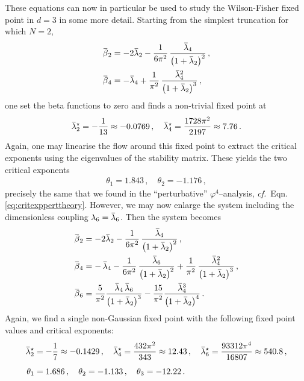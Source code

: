 \documentclass[11pt]{book}
\newcommand{\overbar}[1]{\mkern 1.5mu\overline{\mkern-1.5mu#1\mkern-1.5mu}\mkern 1.5mu}
\newcommand\cf{\textit{cf.}\ }
\numberwithin{equation}{chapter}
\begin{document}
These equations can now in particular be used to study the Wilson-Fisher fixed point
in $d=3$ in some more detail. Starting from the simplest truncation
for which $N=2$,
\begin{align}
  \overbar \beta_2 &=
  -2 \overbar \lambda_2 - \frac{1}{6\pi^2} \, \frac{ \overbar \lambda_4 }{ \big( 1 + \overbar \lambda_2 \big)^2 } \,, \\
  \overbar \beta_4 &=
  - \overbar \lambda_4
  + \frac{1}{\pi^2} \, \frac{ \overbar \lambda_4^2 }{ \big( 1 + \overbar \lambda_2 \big)^3 } \,,
\end{align}
one set the beta functions to zero and finds a non-trivial fixed point at
\begin{align}
  \overbar \lambda_2^\star = - \frac{ 1 }{ 13 } \approx -0.0769 \,,
  \quad
  \overbar \lambda_4^\star = \frac{ 1728 \pi^2 }{ 2197 } \approx 7.76 \,.
\end{align}
Again, one may linearise the flow around this fixed point to extract the critical
exponents using the eigenvalues of the stability matrix. These yields the two
critical exponents
\begin{align}
  \theta_1 = 1.843 \,,
  \quad
  \theta_2 = - 1.176 \,,
\end{align}
precisely the same that we found in the
``perturbative'' $\varphi^4$--analysis, \cf Eqn.\eqref{eq:critexpperttheory}.
However, we may now enlarge the system including the
dimensionless coupling $\lambda_6 = \overbar \lambda_6$. Then the system becomes
\begin{align}
  \overbar \beta_2 &=
  -2 \overbar \lambda_2 - \frac{1}{6\pi^2} \, \frac{ \overbar \lambda_4 }{ \big( 1 + \overbar \lambda_2 \big)^2 } \,, \\
  \overbar \beta_4 &=
  - \, \overbar \lambda_4
  - \frac{1}{6\pi^2} \, \frac{ \overbar \lambda_6 }{ \big( 1 + \overbar \lambda_2 \big)^2 }
  + \frac{1}{\pi^2} \, \frac{ \overbar \lambda_4^2 }{ \big( 1 + \overbar \lambda_2 \big)^3 } \,, \\
  \overbar \beta_6 &=
    \frac{5}{\pi^2} \frac{ \overbar \lambda_4 \, \overbar \lambda_6 }{ \big( 1 + \overbar \lambda_2 \big)^3 }
  - \frac{15}{\pi^2} \frac{ \overbar \lambda_4^3 }{ \big( 1 + \overbar \lambda_2 \big)^4 } \,.
\end{align}
Again, we find a single non-Gaussian fixed point with the following
fixed point values and critical exponents:
\begin{align}
  \overbar \lambda_2^\star &= - \frac{ 1 }{ 7 } \approx -0.1429 \,,
  \quad
  \overbar \lambda_4^\star = \frac{ 432 \pi^2 }{ 343 } \approx 12.43 \,,
  \quad
  \overbar \lambda_6^\star = \frac{ 93312 \pi^4 }{ 16807 } \approx 540.8 \,, \\
  \vphantom{ \frac 17 }
  \theta_1 &= 1.686 \,,
  \quad
  \theta_2 = - 1.133 \,,
  \quad
  \theta_3 = - 12.22 \,.
\end{align}
\end{document}
